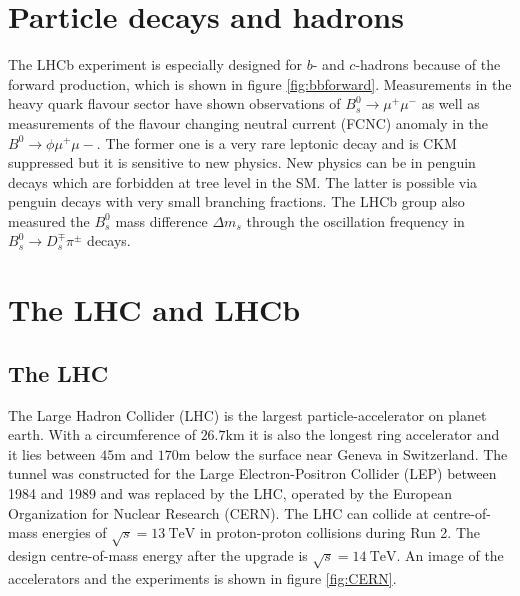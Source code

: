 \section{Particle decays and hadrons}
\label{sec:decays}

The LHCb experiment is especially designed for $\textit{b}$- and $\textit{c}$-hadrons because of the forward production, which is shown in figure \ref{fig:bbforward}.
Measurements in the heavy quark flavour sector have shown observations of $\textit{B}_s^0 \to \mu^{+} \mu^{-}$ \cite{Bmumu} as well as measurements of the flavour changing neutral current (FCNC) anomaly in the
$\textit{B}^0 \to \phi \mu^{+} \mu{-}$.
The former one is a very rare leptonic decay and is CKM suppressed but it is sensitive to new physics.
New physics can be in penguin decays which are forbidden at tree level in the SM.
The latter is possible via penguin decays with very small branching fractions\cite{bsll}. The LHCb group also measured the $\textit{B}_s^0$ mass difference\cite{massdiff} $\Delta m_s$ through the oscillation frequency in $\textit{B}_s^0 \to \textit{D}_s^{\mp} \pi^{\pm}$ decays.


\section{The LHC and LHCb}
\label{sec:lhcandB}

\subsection{The LHC}
The Large Hadron Collider (LHC)\cite{lhcInfo} is the largest particle-accelerator on planet earth. With a circumference of $26.7\si{\kilo\metre}$ it is also the longest ring accelerator and it lies between $45\si{\metre}$ and $170\si{\metre}$ below the surface near Geneva in Switzerland. The tunnel was constructed for the Large Electron-Positron Collider (LEP) between 1984 and 1989 and was replaced by the LHC, operated by the European Organization for Nuclear Research (CERN). The LHC can collide at centre-of-mass energies of $\sqrt{s} = \SI{13}{\tera\electronvolt}$ in proton-proton collisions during Run 2. The design centre-of-mass energy after the upgrade is $\sqrt{s} = \SI{14}{\tera\electronvolt}$.\cite{LHCDR}
An image of the accelerators and the experiments is shown in figure \ref{fig:CERN}.

